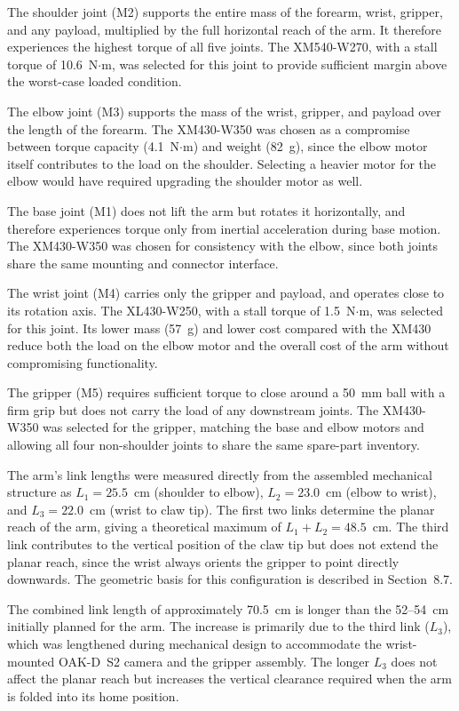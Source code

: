 The shoulder joint (M2) supports the entire mass of the forearm, 
wrist, gripper, and any payload, multiplied by the full horizontal 
reach of the arm. It therefore experiences the highest torque of 
all five joints. The XM540-W270, with a stall torque of 
10.6~N$\cdot$m, was selected for this joint to provide sufficient 
margin above the worst-case loaded condition.

The elbow joint (M3) supports the mass of the wrist, gripper, and 
payload over the length of the forearm. The XM430-W350 was chosen 
as a compromise between torque capacity (4.1~N$\cdot$m) and weight 
(82~g), since the elbow motor itself contributes to the load on 
the shoulder. Selecting a heavier motor for the elbow would have 
required upgrading the shoulder motor as well.

The base joint (M1) does not lift the arm but rotates it 
horizontally, and therefore experiences torque only from inertial 
acceleration during base motion. The XM430-W350 was chosen for 
consistency with the elbow, since both joints share the same 
mounting and connector interface.

The wrist joint (M4) carries only the gripper and payload, and 
operates close to its rotation axis. The XL430-W250, with a stall 
torque of 1.5~N$\cdot$m, was selected for this joint. Its lower 
mass (57~g) and lower cost compared with the XM430 reduce both 
the load on the elbow motor and the overall cost of the arm 
without compromising functionality.

The gripper (M5) requires sufficient torque to close around a 
50~mm ball with a firm grip but does not carry the load of any 
downstream joints. The XM430-W350 was selected for the gripper, 
matching the base and elbow motors and allowing all four 
non-shoulder joints to share the same spare-part inventory.

The arm's link lengths were measured directly from the assembled 
mechanical structure as $L_1 = 25.5$~cm (shoulder to elbow), 
$L_2 = 23.0$~cm (elbow to wrist), and $L_3 = 22.0$~cm (wrist to 
claw tip). The first two links determine the planar reach of the 
arm, giving a theoretical maximum of $L_1 + L_2 = 48.5$~cm. The 
third link contributes to the vertical position of the claw tip 
but does not extend the planar reach, since the wrist always 
orients the gripper to point directly downwards. The geometric 
basis for this configuration is described in 
Section~8.7.

The combined link length of approximately 70.5~cm is longer than 
the 52--54~cm initially planned for the arm. The increase is 
primarily due to the third link ($L_3$), which was lengthened 
during mechanical design to accommodate the wrist-mounted OAK-D~S2 
camera and the gripper assembly. The longer $L_3$ does not affect 
the planar reach but increases the vertical clearance required 
when the arm is folded into its home position.

